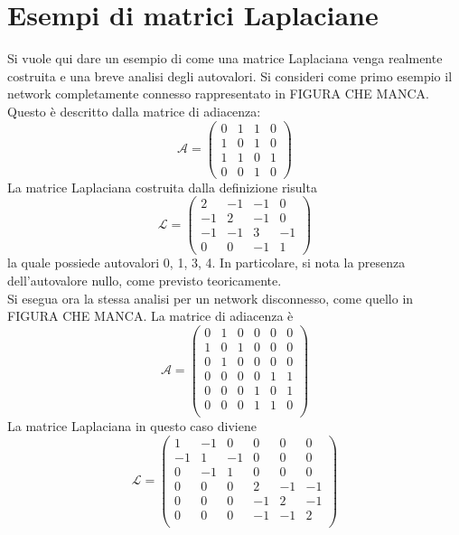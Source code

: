 \documentclass[../main.tex]{subfiles}un
\begin{document}
\chapter{Esempi di matrici Laplaciane}
\label{appendix:laplacian}
Si vuole qui dare un esempio di come una matrice Laplaciana venga realmente costruita e una breve analisi degli autovalori.
Si consideri come primo esempio il network completamente connesso rappresentato in FIGURA CHE MANCA.
Questo \`e descritto dalla matrice di adiacenza:
\begin{equation}
    \mathcal{A}=\left(
    \begin{matrix}
        0 & 1 & 1 & 0\\
        1 & 0 & 1 & 0\\
        1 & 1 & 0 & 1\\
        0 & 0 & 1 & 0
    \end{matrix}\right)
\end{equation}
La matrice Laplaciana costruita dalla definizione risulta
\begin{equation}
    \mathcal{L}=\left(
    \begin{matrix}
        2 & -1 & -1 & 0\\
        -1 & 2 & -1 & 0\\
        -1 & -1 & 3 & -1\\
        0 & 0 & -1 & 1
    \end{matrix}\right)
\end{equation}
la quale possiede autovalori 0, 1, 3, 4.
In particolare, si nota la presenza dell'autovalore nullo, come previsto teoricamente.\\
Si esegua ora la stessa analisi per un network disconnesso, come quello in FIGURA CHE MANCA.
La matrice di adiacenza \`e
\begin{equation}
    \mathcal{A}=\left(
    \begin{matrix}
        0 & 1 & 0 & 0 & 0 & 0\\
        1 & 0 & 1 & 0 & 0 & 0\\
        0 & 1 & 0 & 0 & 0 & 0\\
        0 & 0 & 0 & 0 & 1 & 1\\
        0 & 0 & 0 & 1 & 0 & 1\\
        0 & 0 & 0 & 1 & 1 & 0\\
    \end{matrix}\right)
\end{equation}
La matrice Laplaciana in questo caso diviene
\begin{equation}
    \mathcal{L}=\left(
    \begin{matrix}
        1 & -1 & 0 & 0 & 0 & 0\\
        -1 & 1 & -1 & 0 & 0 & 0\\
        0 & -1 & 1 & 0 & 0 & 0\\
        0 & 0 & 0 & 2 & -1 & -1\\
        0 & 0 & 0 & -1 & 2 & -1\\
        0 & 0 & 0 & -1 & -1 & 2\\
    \end{matrix}\right)
\end{equation}
\end{document}
